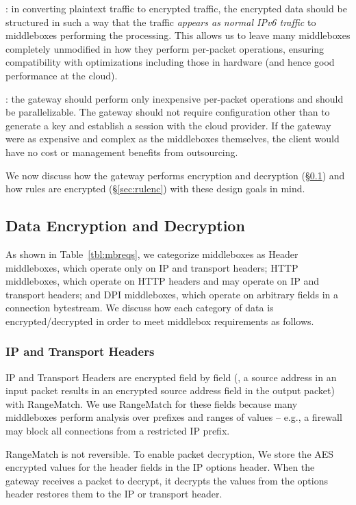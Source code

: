 : in converting plaintext traffic to encrypted traffic, the encrypted data should be structured in such a way that the traffic {\it appears as normal IPv6 traffic} to middleboxes performing the processing. This allows us to leave many middleboxes completely unmodified in how they perform per-packet operations, ensuring compatibility with optimizations including those in hardware (and hence good performance at the cloud). 

: the gateway should perform only inexpensive per-packet operations and should be parallelizable. The gateway should not require configuration other than to generate a key and establish a session with the cloud provider. If the gateway were as expensive and complex as the middleboxes themselves, the client would have no cost or management benefits from outsourcing. 

We now discuss how the gateway performs encryption and decryption (\S\ref{sec:dataenc}) and how rules are encrypted (\S\ref{sec:rulenc}) with these design goals in mind.

\subsection{Data Encryption and Decryption}
\label{sec:dataenc}

As shown in Table~\ref{tbl:mbreqs}, we categorize middleboxes as Header middleboxes, which operate only on IP and transport headers; HTTP middleboxes, which operate on HTTP headers and may operate on IP and transport headers; and DPI middleboxes, which operate on arbitrary fields in a connection bytestream. 
We discuss how each category of data is encrypted/decrypted in order to meet middlebox requirements as follows.

\subsubsection{IP and Transport Headers}
IP and Transport Headers are encrypted field by field (\eg{}, a source address in an input packet results in an encrypted source address field in the output packet) with RangeMatch.
We use RangeMatch for these fields because many middleboxes perform analysis over prefixes and ranges of values -- e.g., a firewall may block all connections from a restricted IP prefix.

 RangeMatch is not reversible. To enable packet decryption, We store the AES encrypted values for the header fields in the IP options header. When the gateway receives a packet to decrypt, it decrypts the values from the options header restores them to the IP or transport header.

